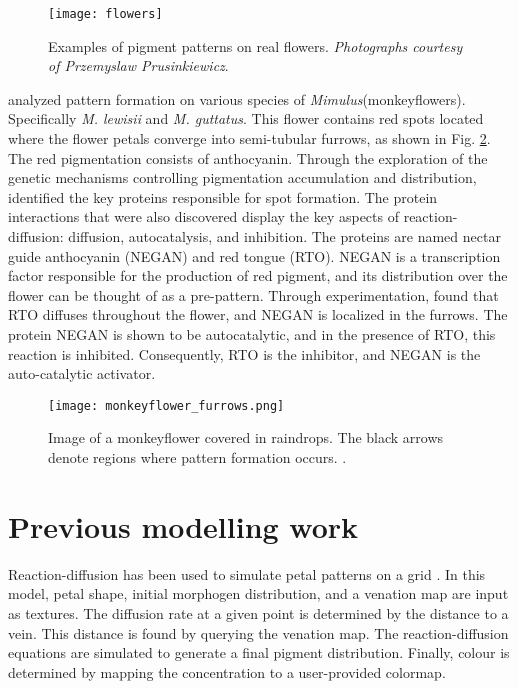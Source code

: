\begin{figure}[!ht]
	\centering
	\texttt{[image: flowers]}
	\caption[Examples of pigment patterns on real flowers]{Examples of pigment patterns on real flowers. \textit{Photographs courtesy of Przemyslaw Prusinkiewicz}.}
	\label{fig:realFlowers}
\end{figure}

\citet{Yuan2019} analyzed pattern formation on various species of \textit{Mimulus}(monkeyflowers). Specifically \textit{M. lewisii} and \textit{M. guttatus}. This flower contains red spots located where the flower petals converge into semi-tubular furrows, as shown in Fig. \ref{fig:monkeyflower_real}. The red pigmentation consists of anthocyanin. Through the exploration of the genetic mechanisms controlling pigmentation accumulation and distribution, \citet{Yuan2019} identified the key proteins responsible for spot formation. The protein interactions that were also discovered display the key aspects of reaction-diffusion: diffusion, autocatalysis, and inhibition. The proteins are named nectar guide anthocyanin (NEGAN) and red tongue (RTO). NEGAN is a transcription factor responsible for the production of red pigment, and its distribution over the flower can be thought of as a pre-pattern. Through experimentation, \citet{Yuan2019} found that RTO diffuses throughout the flower, and NEGAN is localized in the furrows. The protein NEGAN is shown to be autocatalytic, and in the presence of RTO, this reaction is inhibited. Consequently, RTO is the inhibitor, and NEGAN is the auto-catalytic activator.

\begin{figure}[ht]
	\centering
	\texttt{[image: monkeyflower\_furrows.png]}
	\caption[Image of a monkeyflower covered in raindrops]{Image of a monkeyflower covered in raindrops. The black arrows denote regions where pattern formation occurs. .}
	\label{fig:monkeyflower_real}
\end{figure}

\section{Previous modelling work}
Reaction-diffusion has been used to simulate petal patterns on a grid \citep{zhou2007}. In this model, petal shape, initial morphogen distribution, and a venation map are input as textures. The diffusion rate at a given point is determined by the distance to a vein. This distance is found by querying the venation map. The reaction-diffusion equations are simulated to generate a final pigment distribution. Finally, colour is determined by mapping the concentration to a user-provided colormap. %

